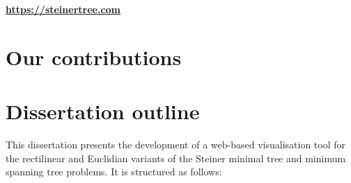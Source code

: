 \documentclass{l4proj}
\begin{document}
\begin{tcolorbox}[title=Access the end product here, colback=gray!10, colframe=gray!80]
    \centering
    \Huge{\textbf{\url{https://steinertree.com}}}
\end{tcolorbox}

\section{Our contributions}

\section{Dissertation outline}

This dissertation presents the development of a web-based visualisation tool for the rectilinear and Euclidian variants of the Steiner minimal tree and minimum spanning tree problems. It is structured as follows:
\end{document}
